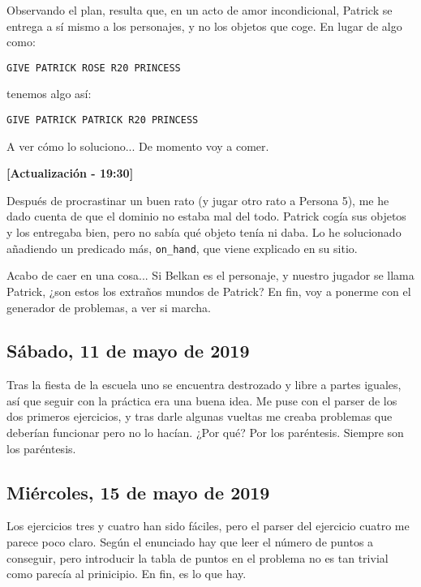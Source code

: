 \documentclass[11pt,a4paper]{article}
\begin{document}
\medskip

Observando el plan, resulta que, en un acto de amor incondicional, Patrick se entrega a sí mismo a los personajes, y no los
objetos que coge. En lugar de algo como:

\medskip
\begin{center}
\texttt{GIVE PATRICK ROSE R20 PRINCESS}
\end{center}

\medskip

tenemos algo así:

\medskip
\begin{center}
\texttt{GIVE PATRICK PATRICK R20 PRINCESS}
\end{center}

\medskip

A ver cómo lo soluciono... De momento voy a comer.

\bigskip

\textbf{[Actualización - 19:30]}

Después de procrastinar un buen rato (y jugar otro rato a Persona 5), me he dado cuenta de que el dominio no
estaba mal del todo. Patrick cogía sus objetos y los entregaba bien, pero no sabía qué objeto tenía ni daba.
Lo he solucionado añadiendo un predicado más, \texttt{on\_hand}, que viene explicado en su sitio.

\medskip

Acabo de caer en una cosa... Si Belkan es el personaje, y nuestro jugador se llama Patrick, 
¿son estos los extraños mundos de Patrick? 
En fin, voy a ponerme con el generador de problemas, a ver si marcha. 

\medskip

\subsection*{Sábado, 11 de mayo de 2019}
Tras la fiesta de la escuela uno se encuentra destrozado y libre a partes iguales, así que seguir con la práctica
era una buena idea. Me puse con el parser de los dos primeros ejercicios, y tras darle algunas vueltas me creaba problemas 
que deberían funcionar pero no lo hacían. ¿Por qué? Por los paréntesis. Siempre son los paréntesis.

\subsection*{Miércoles, 15 de mayo de 2019}
Los ejercicios tres y cuatro han sido fáciles, pero el parser del ejercicio cuatro me parece poco claro. 
Según el enunciado hay que leer el número de puntos a conseguir, pero introducir la tabla de puntos en el problema no es tan
trivial como parecía al prinicipio. En fin, es lo que hay.
\end{document}
